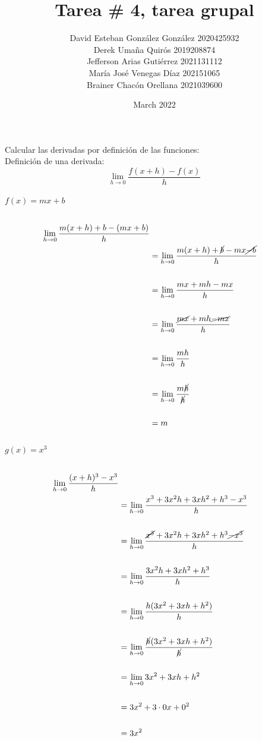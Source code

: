 \documentclass{article}
\title{Tarea \# 4, tarea grupal}
\author{David Esteban González González 2020425932\\Derek Umaña Quirós
2019208874\\Jefferson Arias Gutiérrez 2021131112\\María José Venegas Díaz 
202151065\\Brainer Chacón Orellana 2021039600}
\date{March 2022}
\begin{document}
\maketitle
Calcular las derivadas por definición de las funciones:\\
    Definición de una derivada:\\
\medium
\begin{equation*}
    \lim_{h\to 0} \frac{f(x+h)-f(x)}{h}
\end{equation*}
\\
$f(x) = mx+b$
\begin{equation*} \label{eq1}
\begin{split}
 \\\lim_{h\to 0} \frac{m(x+h)+b-(mx+b)}{h}\\
     &=\lim_{h\to 0}\frac{m(x+h)+\cancel{b}-mx\cancel{-b}}{h}\\
     \\
     &=\lim_{h\to 0}\frac{mx+mh-mx}{h}\\
     \\
     &=\lim_{h\to 0}\frac{\cancel{mx}+mh\cancel{-mx}}{h}\\
     \\
     &=\lim_{h\to 0}\frac{mh}{h}\\
      \\
     &=\lim_{h\to 0}\frac{m\cancel{h}}{\cancel{h}}\\
     \\
     &=m
\end{split}
\end{equation*}
\\
$g(x) = x^3$
\begin{equation*} \label{eq1}
\begin{split}
 \\\lim_{h\to 0} \frac{(x+h)^3-x^3}{h}\\
     &=\lim_{h\to 0}\frac{x^3+3x^2h+3xh^2+h^3-x^3}{h}\\
     \\
     &=\lim_{h\to 0}\frac{\cancel{x^3}+3x^2h+3xh^2+h^3\cancel{-x^3}}{h}\\
     \\
     &=\lim_{h\to 0}\frac{3x^2h+3xh^2+h^3}{h}\\
     \\
     &=\lim_{h\to 0}\frac{h(3x^2+3xh+h^2)}{h}\\
     \\
     &=\lim_{h\to 0}\frac{\cancel{h}(3x^2+3xh+h^2)}{\cancel{h}}\\
     \\
     &=\lim_{h\to 0}3x^2+3xh+h^2\\
     \\
     &=3x^2+3\cdot0x+0^2\\
     \\
     &=3x^2\\
\end{split}
\end{equation*}
\end{document}
